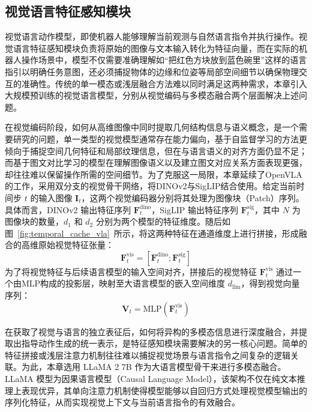 \subsection{视觉语言特征感知模块}
\label{subsec:chap4_perception}

视觉语言动作模型，即使机器人能够理解当前观测与自然语言指令并执行操作。视觉语言特征感知模块负责将原始的图像与文本输入转化为特征向量，而在实际的机器人操作场景中，模型不仅需要准确理解如“把红色方块放到蓝色碗里”这样的语言指引以明确任务意图，还必须捕捉物体的边缘和位姿等局部空间细节以确保物理交互的准确性。传统的单一模态或浅层融合方法难以同时满足这两种需求，本章引入大规模预训练的视觉语言模型，分别从视觉编码与多模态融合两个层面解决上述问题。

在视觉编码阶段，如何从高维图像中同时提取几何结构信息与语义概念，是一个需要研究的问题，单一类型的视觉模型通常存在能力偏向，基于自监督学习的方法更倾向于捕捉空间几何特征和局部纹理信息，但在与语言语义的对齐方面仍显不足；而基于图文对比学习的模型在理解图像语义以及建立图文对应关系方面表现更强，却往往难以保留操作所需的空间细节。为了克服这一局限，本章延续了OpenVLA\cite{kim2024openvla}的工作，采用双分支的视觉骨干网络，将DINOv2\cite{oquab2023dinov2}与SigLIP\cite{zhai2023sigmoid}结合使用。给定当前时间步 $t$ 的输入图像 $\mathbf{I}_t $，这两个视觉编码器分别将其处理为图像块（Patch）序列。具体而言，DINOv2 输出特征序列 $\mathbf{F}^{\text{dino}}_t $，SigLIP 输出特征序列 $\mathbf{F}^{\text{sig}}_t $，其中 $N$ 为图像块的数量，$d_1$ 和 $d_2$ 分别为两个模型的特征维度。随后如图~\ref{fig:temporal_cache_vla}~所示，将这两种特征在通道维度上进行拼接，形成融合的高维原始视觉特征张量：
\begin{equation}
  \mathbf{F}^{\text{vis}}_t = [\mathbf{F}^{\text{dino}}_t; \mathbf{F}^{\text{sig}}_t] 
\end{equation}
为了将视觉特征与后续语言模型的输入空间对齐，拼接后的视觉特征 $\mathbf{F}^{\text{vis}}_t$ 通过一个由MLP构成的投影层，映射至大语言模型的嵌入空间维度 $d_{\text{llm}}$，得到视觉向量序列：
\begin{equation}
  \mathbf{V}_t = \text{MLP}(\mathbf{F}^{\text{vis}}_t) 
\end{equation}

在获取了视觉与语言的独立表征后，如何将异构的多模态信息进行深度融合，并提取出指导动作生成的统一表示，是特征感知模块需要解决的另一核心问题。简单的特征拼接或浅层注意力机制往往难以捕捉视觉场景与语言指令之间复杂的逻辑关联。为此，本章选用 LLaMA 2 7B\cite{touvron2023llama} 作为大语言模型骨干来进行多模态融合。LLaMA 模型为因果语言模型（Causal Language Model），该架构不仅在纯文本推理上表现优异，其单向注意力机制使得模型能够以自回归方式处理视觉模型输出的序列化特征，从而实现视觉上下文与当前语言指令的有效融合。

